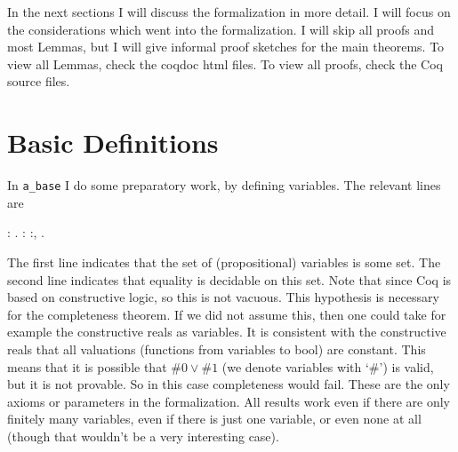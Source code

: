 \documentclass{article}
\newenvironment{code}%
 {\small\begin{list}{}%
         {\setlength{\leftmargin}{10mm}}%
         \item[]%
 }
 {\end{list}}
\begin{document}
In the next sections I will discuss the formalization in more detail. I will focus on the considerations which went into the formalization. I will skip all proofs and most Lemmas, but I will give informal proof sketches for the main theorems. To view all Lemmas, check the coqdoc html files. To view all proofs, check the Coq source files.

\section{Basic Definitions}\label{sec_definitions}
In \verb"a_base" I do some preparatory work, by defining variables. The relevant lines are
\begin{code}
  : .\coqdoceol
\coqdocnoindent
{}  : \coqdockw{\ensuremath{\forall}}  :,       .\coqdoceol
\end{code}
The first line indicates that the set of (propositional) variables is some set. The second line indicates that equality is decidable on this set. Note that since Coq is based on constructive logic, so this is not vacuous. This hypothesis is necessary for the completeness theorem. If we did not assume this, then one could take for example the constructive reals as variables. It is consistent with the constructive reals that all valuations (functions from variables to bool) are constant.\citep{bishop1967foundations} This means that it is possible that $\#0\vee\#1$ (we denote variables with `$\#$') is valid, but it is not provable. So in this case completeness would fail. These are the only axioms or parameters in the formalization. All results work even if there are only finitely many variables, even if there is just one variable, or even none at all (though that wouldn't be a very interesting case).
\end{document}
